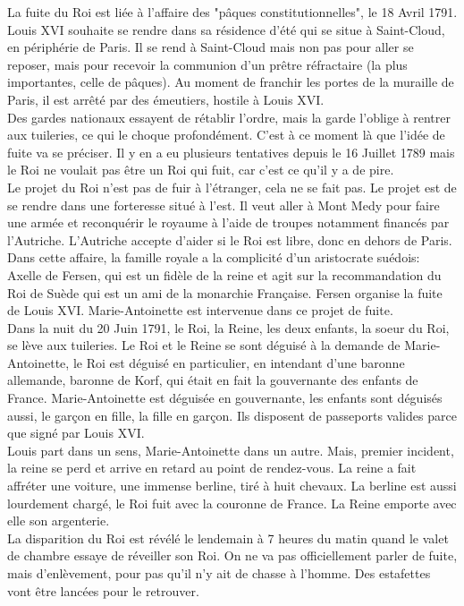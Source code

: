 \documentclass[10pt, a4paper, openany]{book}
\begin{document}
La fuite du Roi est liée à l'affaire des "pâques  constitutionnelles", le 18 Avril 1791. Louis XVI souhaite se rendre dans sa résidence d'été qui se situe à Saint-Cloud, en périphérie de Paris. Il se rend à Saint-Cloud mais non pas pour aller se reposer, mais pour recevoir la communion d'un prêtre réfractaire (la plus importantes, celle de pâques). Au moment de franchir les portes de la muraille de Paris, il est arrêté par des émeutiers, hostile à Louis XVI. \\
Des gardes nationaux essayent de rétablir l'ordre, mais la garde l'oblige à rentrer aux tuileries, ce qui le choque profondément. C'est à ce moment là que l'idée de fuite va se préciser. Il y en a eu plusieurs tentatives depuis le 16 Juillet 1789 mais le Roi ne voulait pas être un Roi qui fuit, car c'est ce qu'il y a de pire. \\
Le projet du Roi n'est pas de fuir à l'étranger, cela ne se fait pas. Le projet est de se rendre dans une forteresse situé à l'est. Il veut aller à Mont Medy pour faire une armée et reconquérir le royaume à l'aide de troupes notamment financés par l'Autriche. L'Autriche accepte d'aider si le Roi est libre, donc en dehors de Paris. \\
Dans cette affaire, la famille royale a la complicité d'un aristocrate suédois: Axelle de Fersen, qui est un fidèle de la reine et agit sur la recommandation du Roi de Suède qui est un ami de la monarchie Française. Fersen organise la fuite de Louis XVI. Marie-Antoinette est intervenue dans ce projet de fuite. \\
Dans la nuit du 20 Juin 1791, le Roi, la Reine, les deux enfants, la soeur du Roi, se lève aux tuileries. Le Roi et le Reine se sont déguisé à la demande de Marie-Antoinette, le Roi est déguisé en particulier, en intendant d'une baronne allemande, baronne de Korf, qui était en fait la gouvernante des enfants de France. Marie-Antoinette est déguisée en gouvernante, les enfants sont déguisés aussi, le garçon en fille, la fille en garçon. Ils disposent de passeports valides parce que signé par Louis XVI. \\
Louis part dans un sens, Marie-Antoinette dans un autre. Mais, premier incident, la reine se perd et arrive en retard au point de rendez-vous. La reine a fait affréter une voiture, une immense berline, tiré à huit chevaux. La berline est aussi lourdement chargé, le Roi fuit avec la couronne de France. La Reine emporte avec elle son argenterie. \\
La disparition du Roi est révélé le lendemain à 7 heures du matin quand le valet de chambre essaye de réveiller son Roi. On ne va pas officiellement parler de fuite, mais d'enlèvement, pour pas qu'il n'y ait de chasse à l'homme. Des estafettes vont être lancées pour le retrouver. \\
\end{document}
